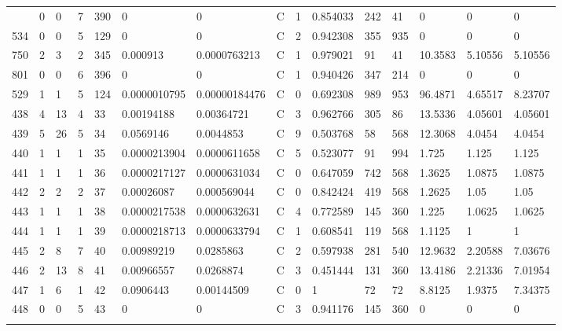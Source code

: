 \begin{latin}
\begin{longtable}{lllllllllllllll}
\begin{comment}
	795 & 0  & 0   & 7  & 390 & 0              & 0              & C & 1  & 0.854033 & 242  & 41   & 0       & 0       & 0       \\
	534 & 0  & 0   & 5  & 129 & 0              & 0              & C & 2  & 0.942308 & 355  & 935  & 0       & 0       & 0       \\
	750 & 2  & 3   & 2  & 345 & 0.000913       & 0.0000763213   & C & 1  & 0.979021 & 91   & 41   & 10.3583 & 5.10556 & 5.10556 \\
	801 & 0  & 0   & 6  & 396 & 0              & 0              & C & 1  & 0.940426 & 347  & 214  & 0       & 0       & 0       \\
	529 & 1  & 1   & 5  & 124 & 0.0000010795   & 0.00000184476  & C & 0  & 0.692308 & 989  & 953  & 96.4871 & 4.65517 & 8.23707 \\
	438 & 4  & 13  & 4  & 33  & 0.00194188     & 0.00364721     & C & 3  & 0.962766 & 305  & 86   & 13.5336 & 4.05601 & 4.05601 \\
	439 & 5  & 26  & 5  & 34  & 0.0569146      & 0.0044853      & C & 9  & 0.503768 & 58   & 568  & 12.3068 & 4.0454  & 4.0454  \\
	440 & 1  & 1   & 1  & 35  & 0.0000213904   & 0.0000611658   & C & 5  & 0.523077 & 91   & 994  & 1.725   & 1.125   & 1.125   \\
	441 & 1  & 1   & 1  & 36  & 0.0000217127   & 0.0000631034   & C & 0  & 0.647059 & 742  & 568  & 1.3625  & 1.0875  & 1.0875  \\
	442 & 2  & 2   & 2  & 37  & 0.00026087     & 0.000569044    & C & 0  & 0.842424 & 419  & 568  & 1.2625  & 1.05    & 1.05    \\
	443 & 1  & 1   & 1  & 38  & 0.0000217538   & 0.0000632631   & C & 4  & 0.772589 & 145  & 360  & 1.225   & 1.0625  & 1.0625  \\
	444 & 1  & 1   & 1  & 39  & 0.0000218713   & 0.0000633794   & C & 1  & 0.608541 & 119  & 568  & 1.1125  & 1       & 1       \\
	445 & 2  & 8   & 7  & 40  & 0.00989219     & 0.0285863      & C & 2  & 0.597938 & 281  & 540  & 12.9632 & 2.20588 & 7.03676 \\
	446 & 2  & 13  & 8  & 41  & 0.00966557     & 0.0268874      & C & 3  & 0.451444 & 131  & 360  & 13.4186 & 2.21336 & 7.01954 \\
	447 & 1  & 6   & 1  & 42  & 0.0906443      & 0.00144509     & C & 0  & 1        & 72   & 72   & 8.8125  & 1.9375  & 7.34375 \\
	448 & 0  & 0   & 5  & 43  & 0              & 0              & C & 3  & 0.941176 & 145  & 360  & 0       & 0       & 0       \\

\end{comment}
\end{longtable}
\end{latin}

